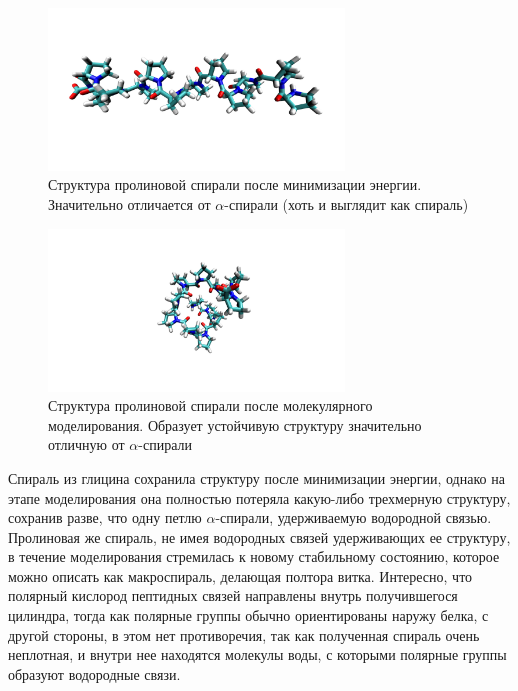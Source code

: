 \documentclass[
11pt,%
tightenlines,%
twoside,%
onecolumn,%
nofloats,%
nobibnotes,%
nofootinbib,%
superscriptaddress,%
noshowpacs,%
centertags]%
{revtex4}
\begin{document}
\begin{figure}[h]
	\centering
	\includegraphics[width=0.7\textwidth]{prolin_em}
	\caption{Структура пролиновой спирали после минимизации энергии. 
		Значительно отличается от $\alpha$-спирали (хоть и выглядит как спираль)}
\end{figure}
\begin{figure}[h]
	\centering
	\includegraphics[width=0.7\textwidth]{prolin_end}
	\caption{Структура пролиновой спирали после молекулярного моделирования. 
		Образует устойчивую структуру значительно отличную от $\alpha$-спирали}
\end{figure}

Спираль из глицина сохранила структуру после минимизации энергии, 
однако на этапе моделирования она полностью потеряла какую-либо трехмерную структуру,
сохранив разве, что одну петлю $\alpha$-спирали, удерживаемую водородной связью.
Пролиновая же спираль, не имея водородных связей удерживающих ее структуру, 
в течение моделирования стремилась к новому стабильному состоянию, 
которое можно описать как макроспираль, делающая полтора витка. 
Интересно, что полярный кислород пептидных связей направлены внутрь получившегося цилиндра,
тогда как полярные группы обычно ориентированы наружу белка, 
с другой стороны, в этом нет противоречия, так как полученная спираль очень неплотная,
и внутри нее находятся молекулы воды, с которыми полярные группы образуют водородные связи. \par
\end{document}
